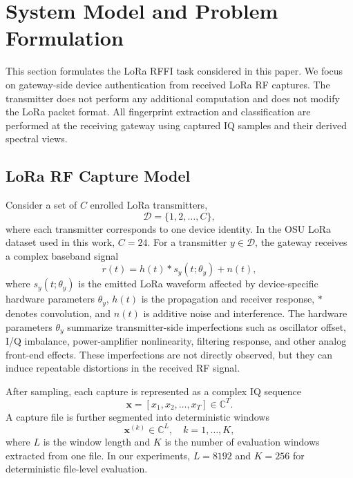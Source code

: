 \section{System Model and Problem Formulation}
\label{sec:system}

This section formulates the LoRa RFFI task considered in this paper. We focus on gateway-side device authentication from received LoRa RF captures. The transmitter does not perform any additional computation and does not modify the LoRa packet format. All fingerprint extraction and classification are performed at the receiving gateway using captured IQ samples and their derived spectral views.

\subsection{LoRa RF Capture Model}

Consider a set of $C$ enrolled LoRa transmitters,
\begin{equation}
    \mathcal{D} = \{1,2,\ldots,C\},
\end{equation}
where each transmitter corresponds to one device identity. In the OSU LoRa dataset used in this work, $C=24$. For a transmitter $y \in \mathcal{D}$, the gateway receives a complex baseband signal
\begin{equation}
    r(t) = h(t) * s_y(t;\theta_y) + n(t),
\end{equation}
where $s_y(t;\theta_y)$ is the emitted LoRa waveform affected by device-specific hardware parameters $\theta_y$, $h(t)$ is the propagation and receiver response, $*$ denotes convolution, and $n(t)$ is additive noise and interference. The hardware parameters $\theta_y$ summarize transmitter-side imperfections such as oscillator offset, I/Q imbalance, power-amplifier nonlinearity, filtering response, and other analog front-end effects. These imperfections are not directly observed, but they can induce repeatable distortions in the received RF signal.

After sampling, each capture is represented as a complex IQ sequence
\begin{equation}
    \mathbf{x} = [x_1,x_2,\ldots,x_T] \in \mathbb{C}^{T}.
\end{equation}
A capture file is further segmented into deterministic windows
\begin{equation}
    \mathbf{x}^{(k)} \in \mathbb{C}^{L}, \quad k=1,\ldots,K,
\end{equation}
where $L$ is the window length and $K$ is the number of evaluation windows extracted from one file. In our experiments, $L=8192$ and $K=256$ for deterministic file-level evaluation.

